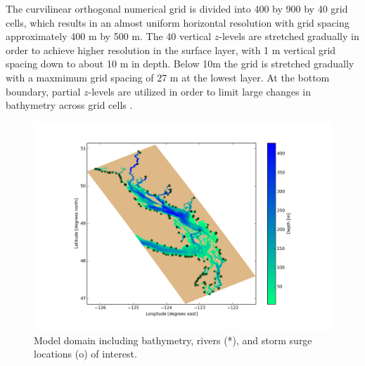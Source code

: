 \documentclass[pdftex,10pt]{article}
\begin{document}
The curvilinear orthogonal numerical grid is divided into 400 by 900 by 40 grid cells, which results in an almost uniform horizontal resolution with grid spacing approximately 400 m by 500 m. The 40 vertical $z$-levels are stretched gradually in order to achieve higher resolution in the surface layer, with 1 m vertical grid spacing down to about 10 m in depth. Below 10m the grid is stretched gradually with a maxmimum grid spacing of 27 m at the lowest layer. At the bottom boundary, partial $z$-levels are utilized in order to limit large changes in bathymetry across grid cells \citep{madec2008nemo}. 


\begin{figure}[h]
\centering
\includegraphics[scale=0.5]{Figures/bathy.png}
\caption{Model domain including bathymetry, rivers (*), and storm surge locations (o) of interest.}\label{fig:domain}
\end{figure}
\end{document}
